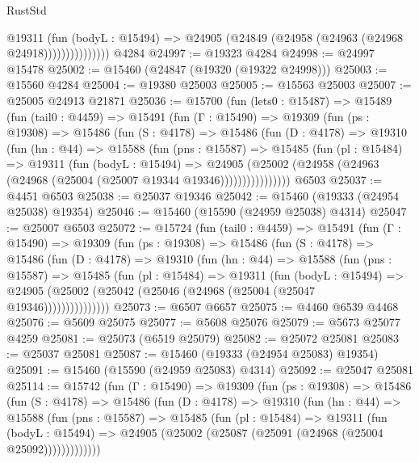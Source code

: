 \begin{lexlean}{RustStd}
\begin{coremodule}
                      @19311
                        (fun (bodyL : @15494) =>
                        @24905 (@24849 (@24958 (@24963 (@24968 @24918)))))))))))))))
    @4284
@24997 := @19323 @4284
@24998 := @24997 @15478
@25002 := @15460 (@24847 (@19320 (@19322 @24998)))
@25003 := @15560 @4284
@25004 := @19380 @25003
@25005 := @15563 @25003
@25007 := @25005 @24913 @21871
@25036 := @15700
    (fun (lets0 : @15487) =>
    @15489
      (fun (tail0 : @4459) =>
      @15491
        (fun (Γ : @15490) =>
        @19309
          (fun (ps : @19308) =>
          @15486
            (fun (S : @4178) =>
            @15486
              (fun (D : @4178) =>
              @19310
                (fun (hn : @44) =>
                @15588
                  (fun (pns : @15587) =>
                  @15485
                    (fun (pl : @15484) =>
                    @19311
                      (fun (bodyL : @15494) =>
                      @24905
                        (@25002
                          (@24958 (@24963 (@24968 (@25004 (@25007 @19344 @19346))))))))))))))))
    @6503
@25037 := @4451 @6503
@25038 := @25037 @19346
@25042 := @15460 (@19333 (@24954 @25038) @19354)
@25046 := @15460 (@15590 (@24959 @25038) @4314)
@25047 := @25007 @6503
@25072 := @15724
    (fun (tail0 : @4459) =>
    @15491
      (fun (Γ : @15490) =>
      @19309
        (fun (ps : @19308) =>
        @15486
          (fun (S : @4178) =>
          @15486
            (fun (D : @4178) =>
            @19310
              (fun (hn : @44) =>
              @15588
                (fun (pns : @15587) =>
                @15485
                  (fun (pl : @15484) =>
                  @19311
                    (fun (bodyL : @15494) =>
                    @24905 (@25002 (@25042 (@25046 (@24968 (@25004 (@25047 @19346)))))))))))))))
@25073 := @6507 @6657
@25075 := @4460 @6539 @4468
@25076 := @5609 @25075
@25077 := @5608 @25076
@25079 := @5673 @25077 @4259
@25081 := @25073 (@6519 @25079)
@25082 := @25072 @25081
@25083 := @25037 @25081
@25087 := @15460 (@19333 (@24954 @25083) @19354)
@25091 := @15460 (@15590 (@24959 @25083) @4314)
@25092 := @25047 @25081
@25114 := @15742
    (fun (Γ : @15490) =>
    @19309
      (fun (ps : @19308) =>
      @15486
        (fun (S : @4178) =>
        @15486
          (fun (D : @4178) =>
          @19310
            (fun (hn : @44) =>
            @15588
              (fun (pns : @15587) =>
              @15485
                (fun (pl : @15484) =>
                @19311
                  (fun (bodyL : @15494) =>
                  @24905 (@25002 (@25087 (@25091 (@24968 (@25004 @25092)))))))))))))

\end{coremodule}
\end{lexlean}
